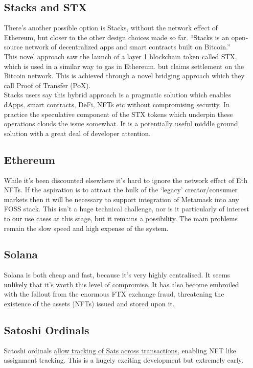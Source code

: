 \subsection{Stacks and STX}
There's another possible option is Stacks, without the network effect of Ethereum, but closer to the other design choices made so far. ``Stacks is an open-source network of decentralized apps and smart contracts built on Bitcoin.''\\ 
This novel approach saw the launch of a layer 1 blockchain token called STX, which is used in a similar way to gas in Ethereum. but claims settlement on the Bitcoin network. This is achieved through a novel bridging approach which they call Proof of Transfer (PoX).\\
Stacks users say this hybrid approach is a pragmatic solution which enables dApps, smart contracts, DeFi, NFTs etc without compromising security. In practice the speculative component of the STX tokens which underpin these operations clouds the issue somewhat. It is a potentially useful middle ground solution with a great deal of developer attention.
\subsection{Ethereum}
While it's been discounted elsewhere it's hard to ignore the network effect of Eth NFTs. If the aspiration is to attract the bulk of the `legacy' creator/consumer markets then it will be necessary to support integration of Metamask into any FOSS stack. This isn't a huge technical challenge, nor is it particularly of interest to our use cases at this stage, but it remains a possibility. The main problems remain the slow speed and high expense of the system.
\subsection{Solana}
Solana is both cheap and fast, because it's very highly centralised. It seems unlikely that it's worth this level of compromise. It has also become embroiled with the fallout from the enormous FTX exchange fraud, threatening the existence of the assets (NFTs) issued and stored upon it.
\subsection{Satoshi Ordinals}
Satoshi ordinals \href{https://github.com/casey/ord}{allow tracking of Sats across transactions}, enabling NFT like assignment tracking. This is a hugely exciting development but extremely early.
